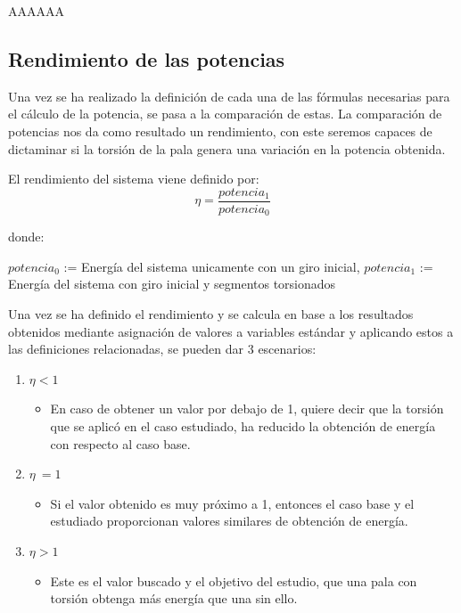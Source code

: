  
 AAAAAA
 
 
 \subsection{Rendimiento de las potencias}
 \label{section:rendimiento}
 
 Una vez se ha realizado la definición de cada una de las fórmulas necesarias para el cálculo de la potencia, se pasa a la comparación de estas. La comparación de potencias nos da como resultado un rendimiento, con este seremos capaces de dictaminar si la torsión de la pala genera una variación en la potencia obtenida.
 
   \begin{definicion}
El rendimiento del sistema viene definido por:
 $$ \eta = \dfrac{potencia_1}{potencia_0} $$ 
 
 donde:
 
  \centering $potencia_0$ := Energía del sistema unicamente con un giro inicial, \hspace{4} $potencia_1$ := Energía del sistema con giro inicial y segmentos torsionados
 \label{def:rendimiento_potencias}
 \end{definicion}
 
 Una vez se ha definido el rendimiento y se calcula en base a los resultados obtenidos mediante asignación de valores a variables estándar y aplicando estos a las definiciones relacionadas, se pueden dar 3 escenarios:
 
 
\begin{enumerate}
    \item $\eta < 1$
        \begin{itemize}
            \item En caso de obtener un valor por debajo de 1, quiere decir que la torsión que se aplicó en el caso estudiado, ha reducido la obtención de energía con respecto al caso base. 
        \end{itemize}
    \item $\eta ~= 1$
        \begin{itemize}
            \item Si el valor obtenido es muy próximo a 1, entonces el caso base y el estudiado proporcionan valores similares de obtención de energía.
        \end{itemize}
    \item $\eta > 1$
        \begin{itemize}
            \item Este es el valor buscado y el objetivo del estudio, que una pala con torsión obtenga más energía que una sin ello.
        \end{itemize}
\end{enumerate}

